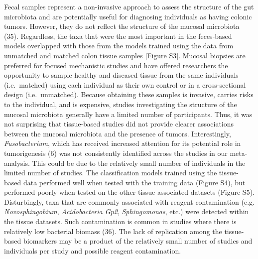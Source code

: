\documentclass[12pt,]{article}
\begin{document}
Fecal samples represent a non-invasive approach to assess the structure
of the gut microbiota and are potentially useful for diagnosing
individuals as having colonic tumors. However, they do not reflect the
structure of the mucosal microbiota (35). Regardless, the taxa that were
the most important in the feces-based models overlapped with those from
the models trained using the data from unmatched and matched colon
tissue samples {[}Figure S3{]}. Mucosal biopsies are preferred for
focused mechanistic studies and have offered researchers the opportunity
to sample healthy and diseased tissue from the same individuals
(i.e.~matched) using each individual as their own control or in a
cross-sectional design (i.e.~unmatched). Because obtaining these samples
is invasive, carries risks to the individual, and is expensive, studies
investigating the structure of the mucosal microbiota generally have a
limited number of participants. Thus, it was not surprising that
tissue-based studies did not provide clearer associations between the
mucosal microbiota and the presence of tumors. Interestingly,
\emph{Fusobacterium}, which has received increased attention for its
potential role in tumorigenesis (6) was not consistently identified
across the studies in our meta-analysis. This could be due to the
relatively small number of individuals in the limited number of studies.
The classification models trained using the tissue-based data performed
well when tested with the training data (Figure S4), but performed
poorly when tested on the other tissue-associated datasets (Figure S5).
Disturbingly, taxa that are commonly associated with reagent
contamination (e.g. \emph{Novosphingobium}, \emph{Acidobacteria Gp2},
\emph{Sphingomonas}, etc.) were detected within the tissue datasets.
Such contamination is common in studies where there is relatively low
bacterial biomass (36). The lack of replication among the tissue-based
biomarkers may be a product of the relatively small number of studies
and individuals per study and possible reagent contamination.
\end{document}
